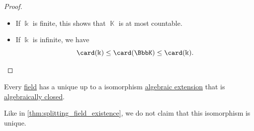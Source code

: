 \begin{proof}
  \begin{itemize}
    \item If \( \Bbbk \) is finite, this shows that \( \BbbK \) is at most countable.
    \item If \( \Bbbk \) is infinite, we have
    \begin{equation*}
      \card(\Bbbk) \leq \card(\BbbK) \leq \card(\Bbbk).
    \end{equation*}
  \end{itemize}
\end{proof}

\begin{proposition}\label{thm:algebraic_closure_existence}
  Every \hyperref[def:field]{field} has a unique up to a isomorphism \hyperref[def:algebraic_extension]{algebraic extension} that is \hyperref[def:algebraically_closed_field]{algebraically closed}.
\end{proposition}
\begin{comments}
  \item Like in \cref{thm:splitting_field_existence}, we do not claim that this isomorphism is unique.
\end{comments}
